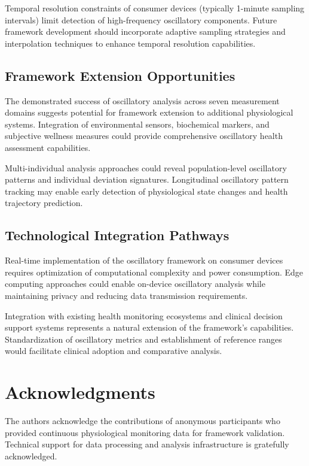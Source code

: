 \documentclass[12pt,a4paper]{article}
\theoremstyle{definition}
\begin{document}
Temporal resolution constraints of consumer devices (typically 1-minute sampling intervals) limit detection of high-frequency oscillatory components. Future framework development should incorporate adaptive sampling strategies and interpolation techniques to enhance temporal resolution capabilities.

\subsection{Framework Extension Opportunities}

The demonstrated success of oscillatory analysis across seven measurement domains suggests potential for framework extension to additional physiological systems. Integration of environmental sensors, biochemical markers, and subjective wellness measures could provide comprehensive oscillatory health assessment capabilities.

Multi-individual analysis approaches could reveal population-level oscillatory patterns and individual deviation signatures. Longitudinal oscillatory pattern tracking may enable early detection of physiological state changes and health trajectory prediction.

\subsection{Technological Integration Pathways}

Real-time implementation of the oscillatory framework on consumer devices requires optimization of computational complexity and power consumption. Edge computing approaches could enable on-device oscillatory analysis while maintaining privacy and reducing data transmission requirements.

Integration with existing health monitoring ecosystems and clinical decision support systems represents a natural extension of the framework's capabilities. Standardization of oscillatory metrics and establishment of reference ranges would facilitate clinical adoption and comparative analysis.

\section{Acknowledgments}

The authors acknowledge the contributions of anonymous participants who provided continuous physiological monitoring data for framework validation. Technical support for data processing and analysis infrastructure is gratefully acknowledged.
\end{document}
